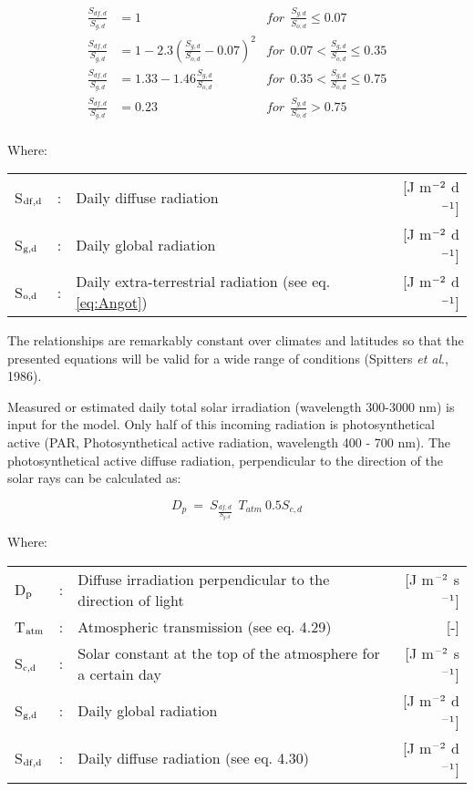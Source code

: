 \documentclass[11pt]{report}
\begin{document}
\begin{align}
{\frac{S _{df,d} }{S _{g, d} }} &= 1 & 
      for ~~ {\frac{S _{g,d} }{S _{o,d} }} \le 0.07 \nonumber \\
{\frac{S _{df,d} }{S _{g,d} }} &= 1-2.3({\frac{S _{g,d} }{S _{o,d} }} -0.07) ^{2} & 
      for ~~ 0.07 < {\frac{S _{g,d} }{S _{o,d} }} \le 0.35  \nonumber \\
{\frac{S _{df,d} }{S _{g,d} }} &= 1.33-1.46{\frac{S _{g,d} }{S _{o,d} }} &
      for ~~ 0.35 < {\frac{S _{g,d} }{S _{o,d} }} \le 0.75 \nonumber \\
{\frac{S _{df,d} }{S _{g,d} }} &= 0.23 &
      for ~~ {\frac{S _{g,d} }{S _{o,d} }} > 0.75 \nonumber \\
\end{align}

Where:\\
\begin{tabularx}{\textwidth}{llXr}
S$_{{\rm df,d}}$ &:& Daily diffuse radiation  & [J m$^{{\rm -2}}$ d$^{{\rm -1}}$]\\
S$_{{\rm g,d}}$ &:& Daily global radiation  & [J m$^{{\rm -2}}$ d$^{{\rm -1}}$]\\
S$_{{\rm o,d}}$ &:& Daily extra-terrestrial radiation (see eq. \ref{eq:Angot})  & [J m$^{{\rm -2}}$ d$^{{\rm -1}}$]\\
\end{tabularx}

The relationships are remarkably constant over climates and latitudes so that the presented
equations will be valid for a wide range of conditions (Spitters {\it et al\/}., 1986).

Measured or estimated daily total solar irradiation (wavelength 300-3000 nm) is input for
the model. Only half of this incoming radiation is photosynthetical active (PAR,
{\nobreak}Photosynthetical active radiation, wavelength 400 - 700 nm). The photosynthetical active
diffuse radiation, perpendicular to the direction of the solar rays can be calculated as:

\begin{equation}
D _{p} ~=~ S _{\frac{df,d}{S _{g,d} }} ~~ T _{atm} ~0.5S _{c,d} 
\end{equation}

 
Where:\\
\begin{tabularx}{\textwidth}{llXr}
D$_{{\rm p}}$ &:& Diffuse irradiation perpendicular to the direction of light  & [J m$^{{\rm -2}}$ s$^{{\rm -1}}$]\\
T$_{{\rm atm}}$ &:& Atmospheric transmission (see eq. 4.29)  & [-]\\
S$_{{\rm c,d}}$ &:& Solar constant at the top of the atmosphere for a certain day  & [J m$^{{\rm -2}}$ s$^{{\rm -1}}$]\\
S$_{{\rm g,d}}$ &:& Daily global radiation  & [J m$^{{\rm -2}}$ d$^{{\rm -1}}$]\\
S$_{{\rm df,d}}$ &:& Daily diffuse radiation (see eq. 4.30)  & [J m$^{{\rm -2}}$ d$^{{\rm -1}}$]\\
\end{tabularx}
\end{document}
